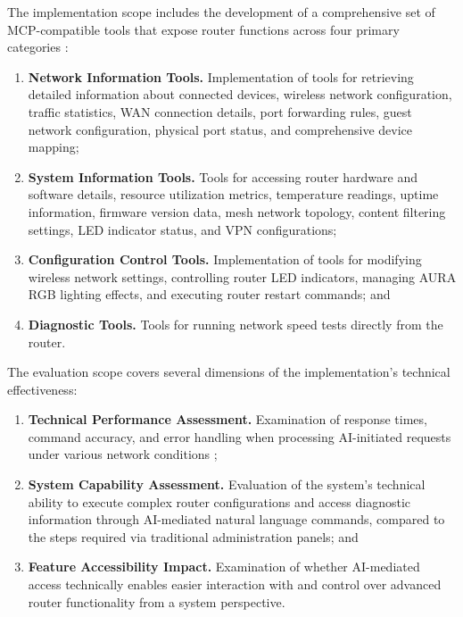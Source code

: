The implementation scope includes the development of a comprehensive set of MCP-compatible tools that expose router functions across four primary categories \cite{mcp_intro}:

\begin{enumerate}
\item \textbf{Network Information Tools.} Implementation of tools for retrieving detailed information about connected devices, wireless network configuration, traffic statistics, WAN connection details, port forwarding rules, guest network configuration, physical port status, and comprehensive device mapping;

\item \textbf{System Information Tools.} Tools for accessing router hardware and software details, resource utilization metrics, temperature readings, uptime information, firmware version data, mesh network topology, content filtering settings, LED indicator status, and VPN configurations;

\item \textbf{Configuration Control Tools.} Implementation of tools for modifying wireless network settings, controlling router LED indicators, managing AURA RGB lighting effects, and executing router restart commands; and

\item \textbf{Diagnostic Tools.} Tools for running network speed tests directly from the router.
\end{enumerate}

The evaluation scope covers several dimensions of the implementation's technical effectiveness:

\begin{enumerate}
\item \textbf{Technical Performance Assessment.} Examination of response times, command accuracy, and error handling when processing AI-initiated requests under various network conditions \cite{ai_infrastructure};

\item \textbf{System Capability Assessment.} Evaluation of the system's technical ability to execute complex router configurations and access diagnostic information through AI-mediated natural language commands, compared to the steps required via traditional administration panels; and

\item \textbf{Feature Accessibility Impact.} Examination of whether AI-mediated access technically enables easier interaction with and control over advanced router functionality from a system perspective.
\end{enumerate}

